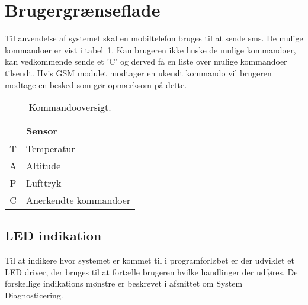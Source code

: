\section{Brugergrænseflade}

Til anvendelse af systemet skal en mobiltelefon bruges til at sende sms. De mulige kommandoer er vist i tabel~\ref{tab:commands}. Kan brugeren ikke huske de mulige kommandoer, kan vedkommende sende et 'C' og derved få en liste over mulige kommandoer tilsendt. Hvis GSM modulet modtager en ukendt kommando vil brugeren modtage en besked som gør opmærksom på dette.

\vskip0.5cm

\begin{table}[h]
	\centering
	\begin{tabular}{|c|l|}
		\hline
		\rowcolor[HTML]{EFEFEF} 
		\multicolumn{1}{|l|}{\cellcolor[HTML]{EFEFEF}\textbf{SMS}} & \textbf{Sensor}	\\ 	\hline
		T & Temperatur	\\ 	\hline
		A & Altitude	\\ 	\hline
		P & Lufttryk	\\ 	\hline
		C & Anerkendte kommandoer	\\ 	\hline		
	\end{tabular}
	\caption{Kommandooversigt.}
	\label{tab:commands}
\end{table}


\subsection{LED indikation}

Til at indikere hvor systemet er kommet til i programforløbet er der udviklet et LED driver, der bruges til at fortælle brugeren hvilke handlinger der udføres. 
De forskellige indikations mønstre er beskrevet i afsnittet om System Diagnosticering. 